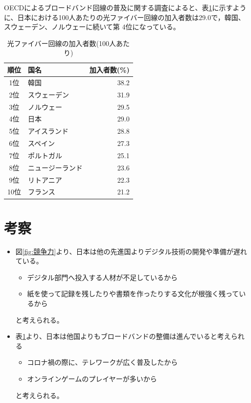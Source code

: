\documentclass[a4paper,11pt,dvipdfmx]{ujarticle}
\begin{document}
OECDによるブロードバンド回線の普及に関する調査\cite{oecd}によると、表\ref{table:整備}に示すように、日本における100人あたりの光ファイバー回線の加入者数は29.0で，韓国、スウェーデン、ノルウェーに続いて第
4位になっている。

\begin{table}[htbp]
 \centering
 \caption{光ファイバー回線の加入者数(100人あたり)}
 \label{table:整備}
  \begin{tabular}{|c|l|r|}
  \hline
   順位 & 国名 & 加入者数(\%) \\
   \hline
   1位 & 韓国 & 38.2 \\
   \hline
   2位 & スウェーデン & 31.9 \\
   \hline
   3位 & ノルウェー & 29.5 \\
   \hline
   4位 & 日本 & 29.0 \\
   \hline
   5位 & アイスランド & 28.8 \\
   \hline
   6位 & スペイン & 27.3 \\
   \hline 
   7位 & ポルトガル & 25.1 \\
   \hline
   8位 & ニュージーランド & 23.6 \\
   \hline
   9位 & リトアニア & 22.3 \\
   \hline
   10位 & フランス & 21.2 \\
   \hline
  \end{tabular} 
\end{table}

\section{考察}
\begin{itemize}
 \item 図\ref{fig:競争力}より、日本は他の先進国よりデジタル技術の開発や準備が遅れている。
  \begin{itemize}
  \item デジタル部門へ投入する人材が不足しているから
  \item 紙を使って記録を残したりや書類を作ったりする文化が根強く残っているから
  \end{itemize}
  と考えられる。
 \item 表\ref{table:整備}より、日本は他国よりもブロードバンドの整備は進んでいると考えられる
   \begin{itemize}
  \item コロナ禍の際に、テレワークが広く普及したから 
  \item オンラインゲームのプレイヤーが多いから
  \end{itemize}
  と考えられる。
\end{itemize}
%

%


\end{document}
